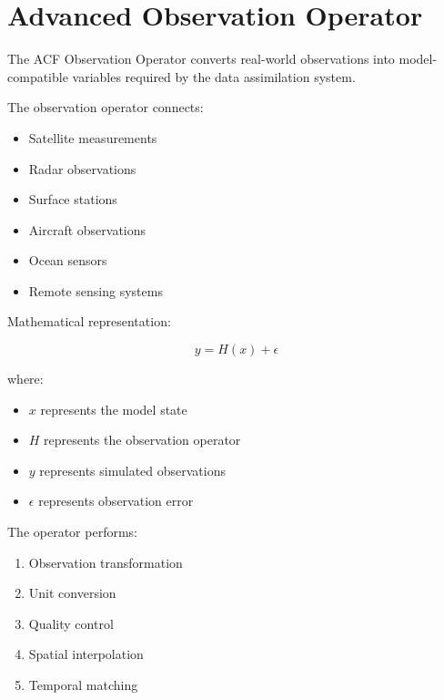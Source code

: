 \section{Advanced Observation Operator}



The ACF Observation Operator converts real-world observations
into model-compatible variables required by the data assimilation
system.



The observation operator connects:


\begin{itemize}

\item Satellite measurements

\item Radar observations

\item Surface stations

\item Aircraft observations

\item Ocean sensors

\item Remote sensing systems

\end{itemize}



Mathematical representation:


\[
y = H(x) + \epsilon
\]



where:


\begin{itemize}

\item $x$ represents the model state

\item $H$ represents the observation operator

\item $y$ represents simulated observations

\item $\epsilon$ represents observation error

\end{itemize}



The operator performs:


\begin{enumerate}

\item Observation transformation

\item Unit conversion

\item Quality control

\item Spatial interpolation

\item Temporal matching

\end{enumerate}



